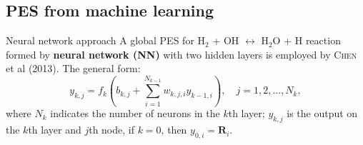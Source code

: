 \documentclass{beamer}
\begin{document}
\subsection{PES from machine learning}
\begin{frame}{Neural network approach}
A global PES for H$_2$ + OH $\leftrightarrow$ H$_2$O + H reaction formed by \textbf{neural network (NN)} with two hidden layers is employed by \textsc{Chen} et al (2013). The general form:
    \begin{equation}
        y_{k,j} = f_k\left(b_{k,j} + \sum^{N_{k-1}}_{i=1}w_{k,j,i} y_{k-1,i}\right), \quad j=1,2,...,N_k,
        \label{eq:nnlayer}
    \end{equation}
    where $N_k$ indicates the number of neurons in the $k$th layer; $y_{k,j}$ is the output on the $k$th layer and $j$th node, if $k=0$, then $y_{0,i} = \mathbf{R}_i$.
\end{frame}
\end{document}

